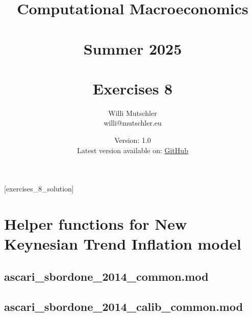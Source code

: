 
\newif\ifDisplaySolutions\DisplaySolutionstrue%


\title{Computational Macroeconomics\\~\\Summer 2025\\~\\Exercises 8}
\author{Willi Mutschler\\willi@mutschler.eu}
\date{Version: 1.0\\Latest version available on: \href{https://github.com/wmutschl/Computational-Macroeconomics/releases/latest/download/exercises_8.pdf}{GitHub}}
\maketitle\thispagestyle{empty}

\newpage
{}[exercises_8_solution]
\tableofcontents\thispagestyle{empty}\newpage

\setcounter{page}{1}
\newpage
\newpage

\printbibliography%

\newpage

\appendix

\section{Helper functions for New Keynesian Trend Inflation model}

\subsection{ascari\_sbordone\_2014\_common.mod\label{app:ascari_sbordone_2014_common}}


\subsection{ascari\_sbordone\_2014\_calib\_common.mod\label{app:ascari_sbordone_2014_calib_common}}


